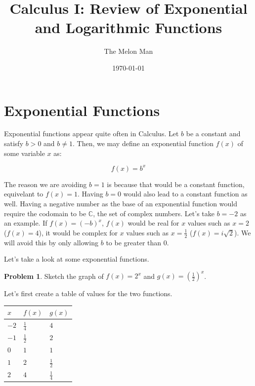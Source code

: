 \documentclass[12pt]{article}
\title{Calculus I: Review of Exponential and Logarithmic Functions}
\author{The Melon Man}
\date{\today}
\theoremstyle{definition}
\newtheorem{problem}{Problem}
\begin{document}
\maketitle

\section{Exponential Functions}
Exponential functions appear quite often in Calculus.
Let $b$ be a constant and satisfy $b>0$ and $b \neq 1$.
Then, we may define an exponential function $f(x)$ of some variable $x$ as:

\begin{equation}
    f(x) = b^x
\end{equation}

The reason we are avoiding $b=1$ is because that would be a constant function, equivelant to $f(x)=1$.
Having $b=0$ would also lead to a constant function as well.
Having a negative number as the base of an exponential function would require the codomain to be $\mathbb{C}$, the set of complex numbers.
Let's take $b=-2$ as an example.
If $f(x)=(-b)^x$, $f(x)$ would be real for $x$ values such as $x=2$ ($f(x)=4$), it would be complex for $x$ values such as $x=\frac{1}{2}$ ($f(x)=i\sqrt{2}$).
We will avoid this by only allowing $b$ to be greater than 0.

Let's take a look at some exponential functions.

\begin{problem}
Sketch the graph of $f(x)=2^x$ and $\displaystyle g(x)=\left(\frac{1}{2}\right)^x$.
\end{problem}

Let's first create a table of values for the two functions.

\begin{table}[h]
    \renewcommand{\arraystretch}{1.5}
    \centering
    \begin{tabular}{>{\centering\arraybackslash}m{1cm}|>{\centering\arraybackslash}m{1cm}|>{\centering\arraybackslash}m{1cm}}
        $x$  & $f(x)$        & $g(x)$        \\ \hline
        $-2$ & $\frac{1}{4}$ & $4$           \\
        $-1$ & $\frac{1}{2}$ & $2$           \\
        $0$  & $1$           & $1$           \\
        $1$  & $2$           & $\frac{1}{2}$ \\
        $2$  & $4$           & $\frac{1}{4}$
    \end{tabular}
\end{table}
\end{document}
